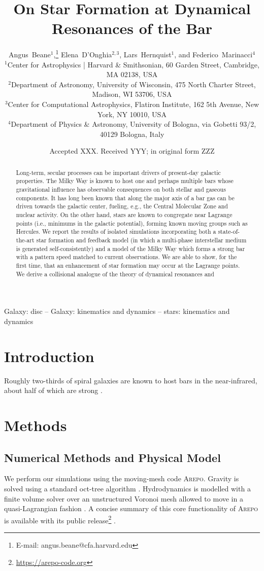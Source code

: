 \documentclass[a4paper,fleqn,usenatbib]{mnras}
\title[Star Bar]{On Star Formation at Dynamical Resonances of the Bar}
\author[A. Beane et al.]{
Angus~Beane$^{1}$,\thanks{E-mail: angus.beane@cfa.harvard.edu}
Elena~D'Onghia$^{2,3}$,
Lars~Hernquist$^{1}$,
and Federico~Marinacci$^{4}$
\\
$^{1}$Center for Astrophysics {\normalfont |} Harvard \& Smithsonian, 60 Garden Street, Cambridge, MA 02138, USA\\
$^{2}$Department of Astronomy, University of Wisconsin, 475 North Charter Street, Madison, WI 53706, USA\\
$^{3}$Center for Computational Astrophysics, Flatiron Institute, 162 5th Avenue, New York, NY 10010, USA\\
$^{4}$Department of Physics \& Astronomy, University of Bologna, via Gobetti 93/2, 40129 Bologna, Italy
}
\date{Accepted XXX. Received YYY; in original form ZZZ}
\newcommand{\arepo}{\textsc{Arepo}}
\begin{document}
\label{firstpage}
\pagerange{\pageref{firstpage}--\pageref{lastpage}}
\maketitle

\begin{abstract}
Long-term, secular processes can be important drivers of present-day galactic
properties. The Milky Way is known to host one and perhaps multiple bars whose
gravitational influence has observable consequences on both stellar and
gaseous components. It has long been known that along the major axis of a bar
gas can be driven towards the galactic center, fueling, e.g., the Central
Molecular Zone and nuclear activity. On the other hand, stars are known to
congregate near Lagrange points (i.e., minimums in the galactic potential),
forming known moving groups such as Hercules. We report the results of
isolated simulations incorporating both a state-of-the-art star formation and
feedback model (in which a multi-phase interstellar medium is generated
self-consistently) and a model of the Milky Way which forms a strong bar with
a pattern speed matched to current observations. We are able to show, for the
first time, that an enhancement of star formation may occur at the Lagrange
points. We derive a collisional analogue of the theory of dynamical resonances
and
\end{abstract}

\begin{keywords}
Galaxy: disc -- Galaxy: kinematics and dynamics -- stars: kinematics and dynamics
\end{keywords}



\section{Introduction}
Roughly two-thirds of spiral galaxies are known to host bars in the
near-infrared, about half of which are strong
\citep[e.g.][]{2000AJ....119..536E}. 

\section{Methods}
\subsection{Numerical Methods and Physical Model}
We perform our simulations using the moving-mesh code \arepo{}. Gravity is
solved using a standard oct-tree algorithm \citep{1986Natur.324..446B}.
Hydrodynamics is modelled with a finite volume solver over an unstructured
Voronoi mesh allowed to move in a quasi-Lagrangian fashion
\citep{2010MNRAS.401..791S, 2016MNRAS.455.1134P}. A concise summary of this
core functionality of \arepo{} is available with its public
release\footnote{\url{https://arepo-code.org}} \citep{2019arXiv190904667W}.
\end{document}
